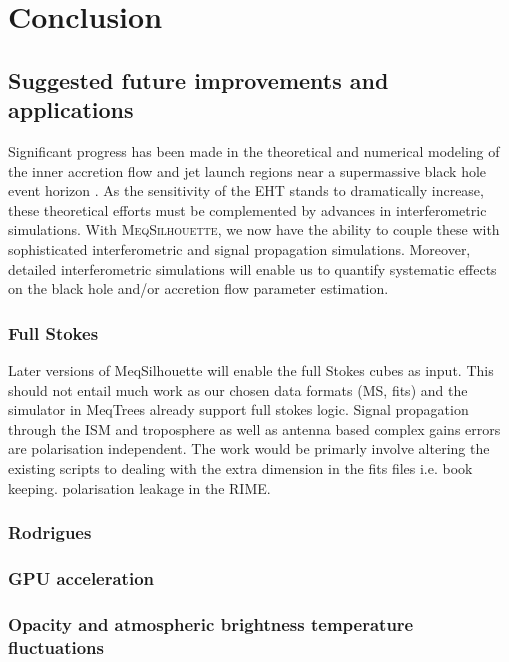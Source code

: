 \chapter{Conclusion}

\section{Suggested future improvements and applications}




Significant progress has been made in the theoretical and numerical modeling of the inner accretion flow and jet launch regions near a supermassive black hole event horizon
\citep[e.g.][]{Zanna_2007,Etienne_2010,Dexter_2013,Moscibrodzka_2014, McKinney_2014}. As the sensitivity of the EHT stands to dramatically increase, these theoretical efforts must be complemented by advances in interferometric simulations. With \textsc{MeqSilhouette}, we now have the ability to couple these with sophisticated interferometric and signal propagation simulations.  Moreover, detailed interferometric simulations will enable us to quantify systematic effects on the black hole and/or accretion flow parameter estimation.

\subsection{Full Stokes}

Later versions of {\sc MeqSilhouette} will enable the full Stokes cubes as input. This should not entail much work as our chosen data formats (MS, {\sc fits}) and the simulator in {\sc MeqTrees} already support full stokes logic. Signal propagation through the ISM and troposphere as well as antenna based complex gains errors are polarisation independent. The work would be primarly involve altering the existing scripts to dealing with the extra dimension in the {\sc fits} files i.e. book keeping. 
polarisation leakage in the RIME.


\subsection{Rodrigues}

\subsection{GPU acceleration}


\subsection{Opacity and atmospheric brightness temperature fluctuations}

